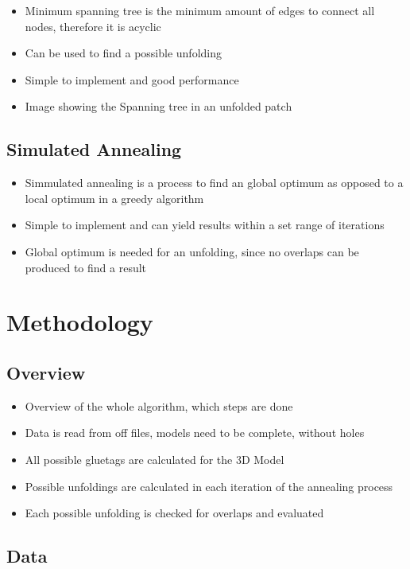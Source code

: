 \documentclass[draft,final]{vutinfth} %
\begin{document}
\begin{itemize}
	\item Minimum spanning tree is the minimum amount of edges to connect all nodes, therefore it is acyclic
	\item Can be used to find a possible unfolding
	\item Simple to implement and good performance
	\item Image showing the Spanning tree in an unfolded patch
\end{itemize}

\section{Simulated Annealing}

\begin{itemize}
	\item Simmulated annealing is a process to find an global optimum as opposed to a local optimum in a greedy algorithm
	\item Simple to implement and can yield results within a set range of iterations
	\item Global optimum is needed for an unfolding, since no overlaps can be produced to find a result
\end{itemize}

\chapter{Methodology}

\section{Overview}

\begin{itemize}
	\item Overview of the whole algorithm, which steps are done
	\item Data is read from off files, models need to be complete, without holes
	\item All possible gluetags are calculated for the 3D Model
	\item Possible unfoldings are calculated in each iteration of the annealing process
	\item Each possible unfolding is checked for overlaps and evaluated
\end{itemize}

\section{Data}
\end{document}
